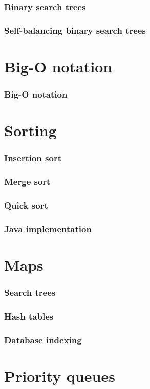 \documentclass{beamer}
\begin{document}
\begin{frame}
 \frametitle{Binary search trees}
\end{frame}

\begin{frame}
 \frametitle{Self-balancing binary search trees}
\end{frame}

\section{Big-O notation}

\begin{frame}
 \frametitle{Big-O notation}
\end{frame}

\section{Sorting}

\begin{frame}
 \frametitle{Insertion sort}
\end{frame}

\begin{frame}
 \frametitle{Merge sort}
\end{frame}

\begin{frame}
 \frametitle{Quick sort}
\end{frame}

\begin{frame}
 \frametitle{Java implementation}
\end{frame}

\section{Maps}

\begin{frame}
 \frametitle{Search trees}
\end{frame}

\begin{frame}
 \frametitle{Hash tables}
\end{frame}

\begin{frame}
 \frametitle{Database indexing}
\end{frame}

\section{Priority queues}
\end{document}
